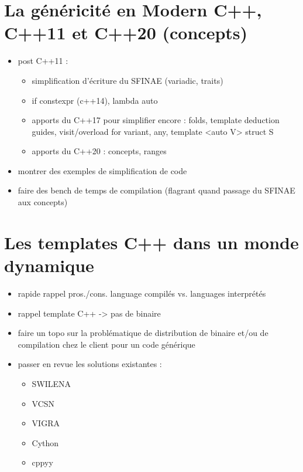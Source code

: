 \documentclass{book}
\begin{document}
\section{La généricité en Modern C++, C++11 et C++20 (concepts)}

\begin{itemize}
  \item post C++11 :
    \begin{itemize}
      \item simplification d'écriture du SFINAE (variadic, traits)
      \item if constexpr (c++14), lambda auto
      \item apports du C++17 pour simplifier encore : folds, template deduction guides, visit/overload for variant, any, template <auto V> struct S
      \item apports du C++20 : concepts, ranges
    \end{itemize}
  \item montrer des exemples de simplification de code
  \item faire des bench de temps de compilation (flagrant quand passage du SFINAE aux concepts)
\end{itemize}

\section{Les templates C++ dans un monde dynamique}

\begin{itemize}
   \item rapide rappel pros./cons. language compilés vs. languages interprétés
   \item rappel template C++ -> pas de binaire
   \item faire un topo sur la problématique de distribution de binaire et/ou de compilation chez le client pour un code générique
   \item passer en revue les solutions existantes :
     \begin{itemize}
       \item SWILENA
       \item VCSN
       \item VIGRA
       \item Cython
       \item cppyy
    \end{itemize}
\end{itemize}


\cleardoublepage
\end{document}
